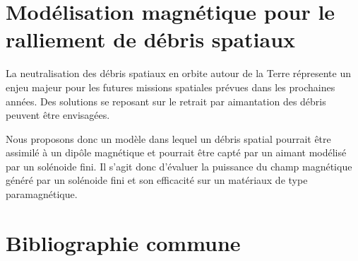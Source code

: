 \documentclass{report}
\begin{document}
\section{Modélisation magnétique pour le ralliement de débris spatiaux}

La neutralisation des débris spatiaux en orbite autour de la Terre répresente un enjeu majeur pour les futures missions spatiales prévues dans les prochaines années. Des solutions se reposant sur le retrait par aimantation des débris peuvent être envisagées.

Nous proposons donc un modèle dans lequel un débris spatial pourrait être assimilé à un dipôle magnétique et pourrait être capté par un aimant modélisé par un solénoide fini. Il s'agit donc d'évaluer la puissance du champ magnétique généré par un solénoide fini et son efficacité sur un matériaux de type paramagnétique. 
\section{Bibliographie commune}
\end{document}
